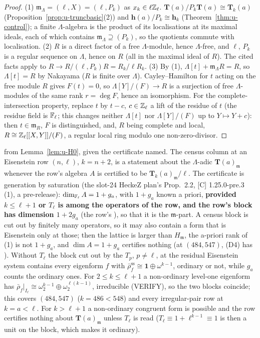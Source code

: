 \documentclass[11pt]{article}
\newcommand{\VERIFYloc}{\textsf{VERIFY}}          %
\newcommand{\Iw}{\Lambda}                         %
\newcommand{\hcusp}{\mathbf{h}}                   %
\newcommand{\Tu}{\mathbf{T}}                      %
\newcommand{\Pk}[1]{P_{#1}}                       %
\newcommand{\Zl}{\Z_\ell}
\begin{document}
\begin{proof}
(1) $\mathfrak m_\Iw=(\ell,X)=(\ell,\Pk k)$ as $x_k\in\ell\Zl$. $\Tu(a)/\Pk k\Tu(a)\cong\Tu_k(a)$ (Proposition~\ref{prop:u-truncbasic}(2)) and $\hcusp(a)/\Pk k\cong\hcusp_k$
(Theorem~\ref{thm:u-control}); a finite $\Iw$-algebra is the product of its localisations at its maximal ideals, each of which contains $\mathfrak m_\Iw\supseteq(\Pk k)$, so the
quotients commute with localisation. (2) $R$ is a direct factor of a free $\Iw$-module, hence $\Iw$-free, and $\ell$, $\Pk k$ is a regular sequence on $\Iw$, hence on $R$ (all in the
maximal ideal of $R$). The cited facts apply to $R\to R/(\ell,\Pk k)R=R_k/\ell R_k$. (3) By (1), $\Iw[t]+\mathfrak m_\Iw R=R$, so $\Iw[t]=R$ by Nakayama ($R$ is finite over $\Iw$).
Cayley--Hamilton for $t$ acting on the free module $R$ gives $F(t)=0$, so $\Iw[Y]/(F)\to R$ is a surjection of free $\Iw$-modules of the same rank $r=\deg F$, hence an isomorphism.
For the complete-intersection property, replace $t$ by $t-c$, $c\in\Zl$ a lift of the residue of $t$ (the residue field is $\mathbb{F}_\ell$; this changes neither $\Iw[t]$ nor
$\Iw[Y]/(F)$ up to $Y\mapsto Y+c$): then $t\in\mathfrak m_R$, $F$ is distinguished, and, $R$ being complete and local, $R\cong\Zl[[X,Y]]/(F)$, a regular local ring modulo one
non-zero-divisor.
\end{proof}

\begin{remark}\label{rmk:u-H0census}
\PROVED{} from Lemma~\ref{lem:u-H0}, given the certificate named. The census column  at an Eisenstein row $(n,\ell)$, $k=n+2$, is a statement about the
$\Iw$-adic $\Tu(a)_{\mathfrak m}$ whenever the row's algebra $A$ is certified to be $\Tu_k(a)_{\mathfrak m}/\ell$. The certificate is generation by saturation (the slot-24 HeckeZ
plan's Prop.~2.2, [C] 1.25.0-pre.3 (1), a pre-release): $\dim_{\mathbb{F}_\ell}A=1+g_a$, with
$1+g_a$ known a priori, \textbf{provided $k\le\ell+1$ or $T_\ell$ is among the operators of the row, and the row's block has dimension $1+2g_a$} (the row's ), so
that it is the $\mathfrak m$-part. A census block is cut out by finitely many operators, so it may also contain a form that is Eisenstein only at those; then the lattice is larger than
$H_{\mathfrak m}$, the a-priori rank of (1) is not $1+g_a$, and $\dim A=1+g_a$ certifies nothing (at $(484,547)$, (D4) has ). Without $T_\ell$ the block cut out by the $T_p$, $p\ne\ell$, at the residual
Eisenstein system contains every eigenform $f$ with $\bar\rho_f^{\mathrm{ss}}\cong\mathbf1\oplus\omega^{k-1}$, ordinary or not, while $g_a$ counts the ordinary ones. For
$2\le k\le\ell+1$ a non-ordinary level-one eigenform has $\bar\rho_f|_{I_\ell}\cong\omega_2^{k-1}\oplus\omega_2^{\ell(k-1)}$, irreducible
(\VERIFYloc), so the two blocks coincide; this covers $(484,547)$ ($k=486<548$) and every irregular-pair row at
$k=a<\ell$. For $k>\ell+1$ a non-ordinary congruent form is possible and the row certifies nothing about $\Tu(a)_{\mathfrak m}$ unless $T_\ell$ is read ($T_\ell\equiv1+\ell^{k-1}\equiv1$
is then a unit on the block, which makes it ordinary).
\end{remark}
\end{document}
